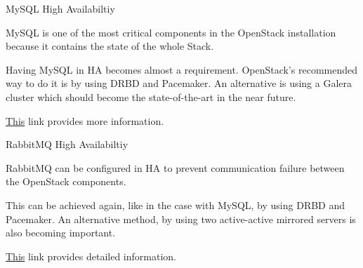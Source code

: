 \documentclass[english,serif,mathserif]{beamer}
\begin{document}
\begin{frame}{MySQL High Availabiltiy}

MySQL is one of the most critical components in the OpenStack installation because 
it contains the state of the whole Stack.

\vspace{5 mm}

Having MySQL in HA becomes almost a requirement. OpenStack's recommended way to 
do it is by using DRBD and Pacemaker. An alternative is using a Galera cluster 
which should become the state-of-the-art in the near future. 

\vspace{5 mm}

{\color{blue}\href{http://docs.openstack.org/high-availability-guide/content/s-mysql.html}{This}} 
link provides more information.

\end{frame}

\begin{frame}{RabbitMQ High Availabiltiy}

RabbitMQ can be configured in HA to prevent communication failure between the OpenStack components.

\vspace{5 mm}

This can be achieved again, like in the case with MySQL, by using DRBD and Pacemaker. 
An alternative method, by using two active-active mirrored servers is also becoming important. 

\vspace{5 mm}

{\color{blue}\href{http://docs.openstack.org/high-availability-guide/content/s-rabbitmq.html}{This}} 
link provides detailed information. 

\end{frame}
\end{document}
